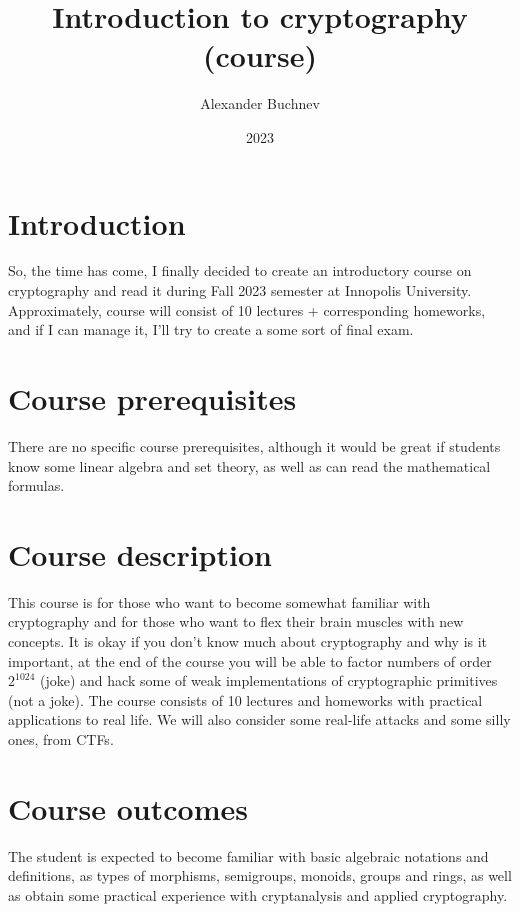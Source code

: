 \documentclass{article}
\title{Introduction to cryptography (course)}
\author{Alexander Buchnev}
\date{2023}
\begin{document}
\maketitle

\section*{Introduction}
So, the time has come, I finally decided to create an introductory course on cryptography and read it during Fall 2023 semester at Innopolis University.
Approximately, course will consist of 10 lectures + corresponding homeworks, and if I can manage it, I'll try to create a some sort of final exam. 

\section*{Course prerequisites}
There are no specific course prerequisites, although it would be great if students know some linear algebra and set theory, 
as well as can read the mathematical formulas.

\section*{Course description}
This course is for those who want to become somewhat familiar with cryptography and for those who want to flex their brain muscles with new concepts.
It is okay if you don't know much about cryptography and why is it important, at the end of the course you will be able to factor numbers of order $2^{1024}$
(joke) and hack some of weak implementations of cryptographic primitives (not a joke). The course consists of 10 lectures and homeworks with 
practical applications to real life. We will also consider some real-life attacks and some silly ones, from CTFs. 

\section*{Course outcomes}
The student is expected to become familiar with basic algebraic notations and definitions, as types of morphisms, semigroups, monoids, groups and rings, as well as obtain some practical experience with cryptanalysis and applied cryptography. 
\end{document}
